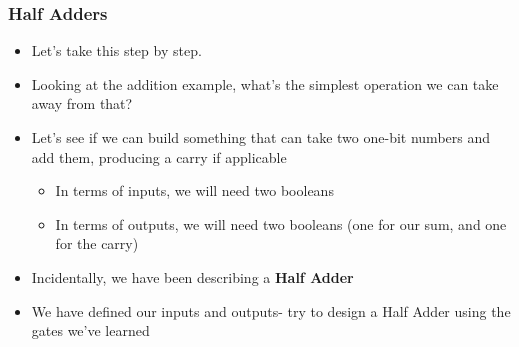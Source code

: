 \documentclass{beamer}
\begin{document}
		\begin{frame}
			\frametitle{Half Adders}
			\begin{itemize}
				\item Let's take this step by step.
				\item Looking at the addition example, what's the simplest operation we can take away from that?
				\item Let's see if we can build something that can take two one-bit numbers and add them, producing a carry if applicable
				\begin{itemize}
					\item In terms of inputs, we will need two booleans
					\item In terms of outputs, we will need two booleans (one for our sum, and one for the carry)
				\end{itemize}
				\item Incidentally, we have been describing a \textbf{Half Adder}
				\item We have defined our inputs and outputs- try to design a Half Adder using the gates we've learned
			\end{itemize}
			
				
		\end{frame}
		
\end{document}
